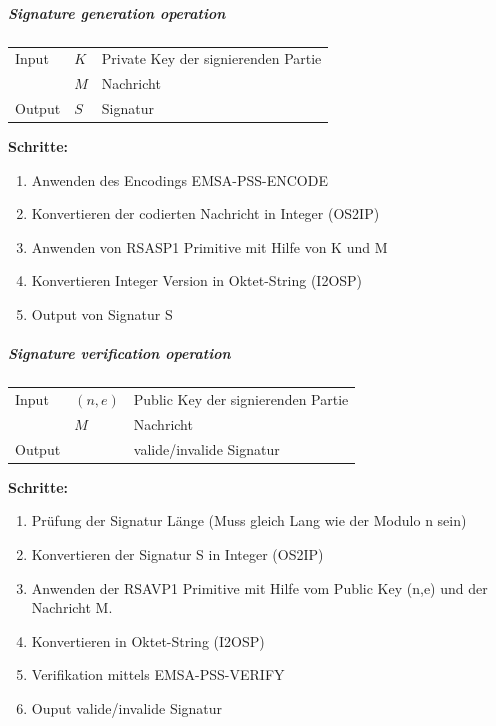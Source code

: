 \documentclass[10pt,a4paper]{article}
\begin{document}
\subparagraph{Signature generation operation}
\begin{table}[ht]
    \begin{tabular}{lll}
        Input & $K$ & Private Key der signierenden Partie \\
         & $M$ & Nachricht \\
        Output & $S$ & Signatur
    \end{tabular}
\end{table}


\textbf{Schritte:}
\begin{enumerate}
    \item Anwenden des Encodings EMSA-PSS-ENCODE
    \item Konvertieren der codierten Nachricht in Integer (OS2IP)
    \item Anwenden von RSASP1 Primitive mit Hilfe von K und M
    \item Konvertieren Integer Version in Oktet-String (I2OSP)
    \item Output von Signatur S
\end{enumerate}

\subparagraph{Signature verification operation}
\begin{table}[ht]
    \begin{tabular}{lll}
        Input & $(n, e)$ & Public Key der signierenden Partie \\
         & $M$ & Nachricht \\
        Output & & valide/invalide Signatur
    \end{tabular}
\end{table}

\textbf{Schritte:}
\begin{enumerate}
    \item Prüfung der Signatur Länge (Muss gleich Lang wie der Modulo n sein)
    \item Konvertieren der Signatur S in Integer (OS2IP)
    \item Anwenden der RSAVP1 Primitive mit Hilfe vom Public Key (n,e) und der
        Nachricht M.
    \item Konvertieren in Oktet-String (I2OSP)
    \item Verifikation mittels EMSA-PSS-VERIFY
    \item Ouput valide/invalide Signatur
\end{enumerate}
\end{document}
